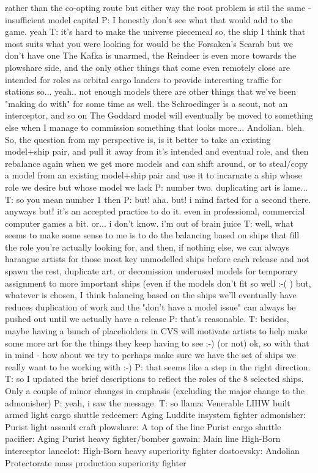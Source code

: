 rather than the co-opting route
but either way the root problem is stil the same - insufficient model capital
P: I honestly don't see what that would add to the game.
yeah
T: it's hard to make the universe piecemeal
so, the ship I think that most suits what you were looking for would be the Forsaken's Scarab
but we don't have one
The Kafka is unarmed, the Reindeer is even more towards the plowshare side, and the only other things that come even remotely close are intended for roles as orbital cargo landers to provide interesting traffic for stations
so... 
yeah.. not enough models
there are other things that we've been "making do with" for some time as well.
the Schroedinger is a scout, not an interceptor, and so on 
The Goddard model will eventually be moved to something else when I manage to commission something that looks more... Andolian.
bleh.
So, the question from my perspective is, is it better to take an existing model+ship pair, and pull it away from it's intended and eventual role, and then rebalance again when we get more models and can shift around, or to steal/copy a model from an existing model+ship pair and use it to incarnate a ship whose role we desire but whose model we lack
P: number two.
duplicating art is lame...
T: so you mean number 1 then
P: but!
aha. but!
i mind farted for a second there.
anyways
but! it's an accepted practice to do it. 
even in professional, commercial computer games a bit.
or... i don't know.
i'm out of brain juice
T: well, what seems to make some sense to me is to do the balancing based on ships that fill the role you're actually looking for, and then, if nothing else, we can always harangue artists for those most key unmodelled ships before each release and not spawn the rest, duplicate art, or decomission underused models for temporary assignment to more important ships (even if the models don't fit so well :-( )
but, whatever is chosen, I think balancing based on the ships we'll eventually have reduces duplication of work and the "don't have a model issue" can always be pushed out until we actually have a release
P: that's reasonable.
T: besides, maybe having a bunch of placeholders in CVS will motivate artists to help make some more art for the things they keep having to see ;-) (or not)
ok, so with that in mind - how about we try to perhaps make sure we have the set of ships we really want to be working with :-)
P: that seems like a step in the right direction.
T: so I updated the brief descriptions to reflect the roles of the 8 selected ships. Only a couple of minor changes in emphasis (excluding the major change to the admonisher)
P: yeah, i saw the message.
T: so
llama: Venerable LIHW built armed light cargo shuttle
redeemer: Aging Luddite insystem fighter
admonisher: Purist light assault craft
plowshare: A top of the line Purist cargo shuttle
pacifier: Aging Purist heavy fighter/bomber
gawain: Main line High-Born interceptor
lancelot: High-Born heavy superiority fighter
dostoevsky: Andolian Protectorate mass production superiority fighter

